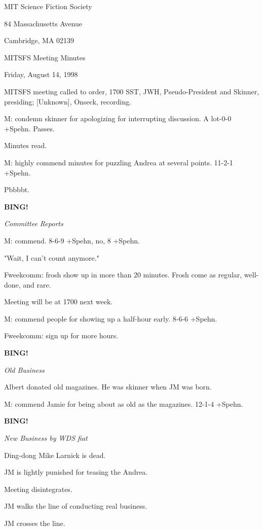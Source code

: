 \documentclass[12pt]{article}
\newcommand{\bing}{{\bf BING!} }
\newcommand{\goto}[1]{\bing \vskip 12pt \centerline{{\em{#1}}}}
\begin{document}
\begin{center}

MIT Science Fiction Society 

84 Massachusetts Avenue

Cambridge, MA 02139

\vspace{12pt}

MITSFS Meeting Minutes 

Friday, August 14, 1998

\end{center}
 
\vspace{18pt}

\setlength{\parskip}{6pt}

\noindent
MITSFS meeting called to order, 1700 SST,
JWH, Pseudo-President and Skinner, presiding; [Unknown], Onseck, recording.

M: condemn skinner for apologizing for interrupting discussion. A lot-0-0 +Spehn. Passes.

Minutes read.

M: highly commend minutes for puzzling Andrea at several points. 11-2-1 +Spehn.

Pbbbbt.

\goto{Committee Reports}

M: commend. 8-6-9 +Spehn, no, 8 +Spehn.

"Wait, I can't count anymore."

Fweekcomm: frosh show up in more than 20 minutes. Frosh come as regular, well-done, and rare.

Meeting will be at 1700 next week.

M: commend people for showing up a half-hour early. 8-6-6 +Spehn.

Fweekcomm: sign up for more hours.

\goto{Old Business}

Albert donated old magazines. He was skinner when JM was born.

M: commend Jamie for being about as old as the magazines. 12-1-4 +Spehn.

\goto{New Business by WDS fiat}

Ding-dong Mike Larnick is dead.

JM is lightly punished for teasing the Andrea.

Meeting disintegrates.

JM walks the line of conducting real business.

JM crosses the line.
\end{document}
